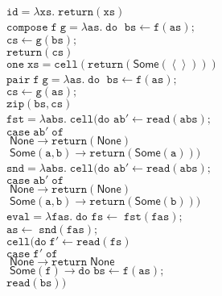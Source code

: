 \documentclass[preprint]{sigplanconf}
\newcommand{\term}[1]{\ensuremath{\mathtt{{#1}}}}
\newcommand{\unitval}{\left<\right>}
\newcommand{\None}{\mathsf{None}}
\newcommand{\Some}[1]{\mathsf{Some}({#1})}
\begin{document}
\begin{figure}
\begin{tabbing}
\term{id = \lambda xs.\;return(xs)} 
\\[1em]

\term{compose\;f\;g =\lambda as.\; do\;}
 \=\term{bs \leftarrow f(as);} \\
 \>\term{cs \leftarrow g(bs);} \\
 \>\term{return(cs)} 
\\[1em]

\term{one\;xs = cell(return(\Some{\unitval}))}
\\[1em]

\term{pair\;f\;g = \lambda as.\;do\;}
  \=\term{bs \leftarrow f(as);} \\
  \>\term{cs \leftarrow g(as);} \\
  \>\term{zip(bs,cs)}
\\[1em]

\term{fst = \lambda abs.\;cell(do}
  \= \term{ab' \leftarrow read(abs);} \\
  \>\term{case \; ab'\; of} \\
  \>\term{\;\None \to return(\None)} \\
  \>\term{\;\Some{a,b} \to return(\Some{a}))} 
\\[1em]


\term{snd = \lambda abs.\;cell(do}
  \= \term{ab' \leftarrow read(abs);} \\
  \>\term{case \; ab'\; of} \\
  \>\term{\;\None \to return(\None)} \\
  \>\term{\;\Some{a,b} \to return(\Some{b}))} 
\\[1em]

\term{eval = \lambda fas.\;do}\;
              \=\term{fs \leftarrow \;fst(fas);}\\
              \>\term{as \leftarrow \;snd(fas);}\\
              \>\term{cell(do\;}\=\term{f' \leftarrow read(fs)}\\
              \>                  \>\term{case\;f'\;of}\\
              \>                  \>\term{\;\None \to return\;\None} \\
              \>                  \>\term{\;\Some{f} \to do\;}\=\term{bs \leftarrow f(as);} \\
              \>                  \>                            \>$\term{read(bs)})$ 
\\[1em]


\end{tabbing}
\end{figure}
\end{document}
